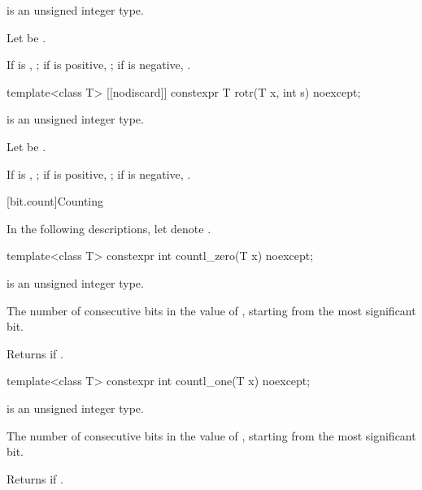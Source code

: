 %
\begin{itemdescr}
\pnum
\constraints
{} is an unsigned integer type.

\pnum
Let  be .

\pnum
\returns
If  is , ;
if  is positive, ;
if  is negative, .
\end{itemdescr}

\begin{itemdecl}
template<class T>
  [[nodiscard]] constexpr T rotr(T x, int s) noexcept;
\end{itemdecl}

%
\begin{itemdescr}
\pnum
\constraints
{} is an unsigned integer type.

\pnum
Let  be .

\pnum
\returns
If  is , ;
if  is positive, ;
if  is negative, .
\end{itemdescr}

[bit.count]{Counting}

In the following descriptions,
let  denote .

\begin{itemdecl}
template<class T>
  constexpr int countl_zero(T x) noexcept;
\end{itemdecl}

%
\begin{itemdescr}
\pnum
\constraints
{} is an unsigned integer type.

\pnum
\returns
The number of consecutive  bits in the value of ,
starting from the most significant bit.
\begin{note}
Returns  if .
\end{note}
\end{itemdescr}

\begin{itemdecl}
template<class T>
  constexpr int countl_one(T x) noexcept;
\end{itemdecl}

%
\begin{itemdescr}
\pnum
\constraints
{} is an unsigned integer type.

\pnum
\returns
The number of consecutive  bits in the value of ,
starting from the most significant bit.
\begin{note}
Returns  if .
\end{note}
\end{itemdescr}

